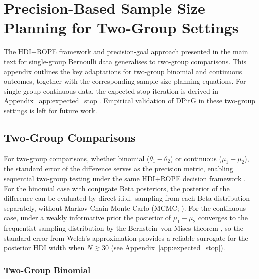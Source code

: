 \section{Precision-Based Sample Size Planning for Two-Group Settings}\label{app:extensions}

The HDI+ROPE framework and precision-goal approach presented in the main text for single-group
Bernoulli data generalises to two-group comparisons.
This appendix outlines the key adaptations for two-group binomial and continuous
outcomes, together with the corresponding sample-size planning equations.
For single-group continuous data, the expected stop iteration is derived in
Appendix~\ref{app:expected_stop}.
Empirical validation of DPitG in these two-group settings is left for future work.

\subsection*{Two-Group Comparisons}

For two-group comparisons, whether binomial ($\theta_1 - \theta_2$) or continuous
($\mu_1 - \mu_2$), the standard error of the difference serves as the precision
metric, enabling sequential two-group testing under the same HDI+ROPE decision framework
\citep{kruschke2013}.
For the binomial case with conjugate Beta posteriors, the posterior of the difference
can be evaluated by direct i.i.d.\ sampling from each Beta distribution separately,
without Markov Chain Monte Carlo (MCMC; \citealt{gelman2013bayesian}).
For the continuous case, under a weakly informative prior the posterior of
$\mu_1 - \mu_2$ converges to the frequentist sampling distribution by the
Bernstein--von Mises theorem \citep{gelman2013bayesian}, so the standard error from
Welch's approximation provides a reliable surrogate for the posterior HDI width when
$N \gtrsim 30$ (see Appendix~\ref{app:expected_stop}).

\subsubsection*{Two-Group Binomial}

